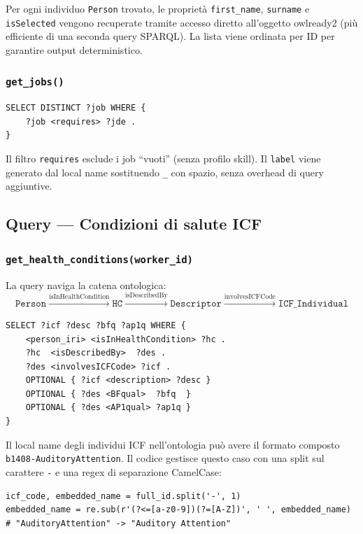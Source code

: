 \documentclass[a4paper,12pt]{article}
\begin{document}
Per ogni individuo \texttt{Person} trovato, le propriet\`{a}
\texttt{first\_name}, \texttt{surname} e \texttt{isSelected} vengono
recuperate tramite accesso diretto all'oggetto owlready2 (pi\`{u} efficiente
di una seconda query SPARQL). La lista viene ordinata per ID per garantire
output deterministico.

\subsubsection{\texttt{get\_jobs()}}

\begin{lstlisting}[caption={SPARQL per la lista dei job.}]
SELECT DISTINCT ?job WHERE {
    ?job <requires> ?jde .
}
\end{lstlisting}

\noindent Il filtro \texttt{requires} esclude i job ``vuoti'' (senza profilo skill).
Il \texttt{label} viene generato dal local name sostituendo \texttt{\_}
con spazio, senza overhead di query aggiuntive.

\subsection{Query --- Condizioni di salute ICF}

\subsubsection{\texttt{get\_\allowbreak{}health\_\allowbreak{}conditions(worker\_\allowbreak{}id)}}

La query naviga la catena ontologica:
\[
\texttt{Person} \xrightarrow{\text{isInHealthCondition}} \texttt{HC}
\xrightarrow{\text{isDescribedBy}} \texttt{Descriptor}
\xrightarrow{\text{involvesICFCode}} \texttt{ICF\_Individual}
\]

\begin{lstlisting}[caption={SPARQL per le condizioni ICF di un worker.}]
SELECT ?icf ?desc ?bfq ?ap1q WHERE {
    <person_iri> <isInHealthCondition> ?hc .
    ?hc  <isDescribedBy>  ?des .
    ?des <involvesICFCode> ?icf .
    OPTIONAL { ?icf <description> ?desc }
    OPTIONAL { ?des <BFqual>  ?bfq  }
    OPTIONAL { ?des <AP1qual> ?ap1q }
}
\end{lstlisting}

\noindent Il local name degli individui ICF nell'ontologia pu\`{o} avere il formato
composto \texttt{b1408-AuditoryAttention}. Il codice gestisce questo
caso con una split sul carattere \texttt{-} e una regex di separazione
CamelCase:
\begin{lstlisting}[caption={Parsing dei compound IRI ICF.}]
icf_code, embedded_name = full_id.split('-', 1)
embedded_name = re.sub(r'(?<=[a-z0-9])(?=[A-Z])', ' ', embedded_name)
# "AuditoryAttention" -> "Auditory Attention"
\end{lstlisting}
\end{document}
